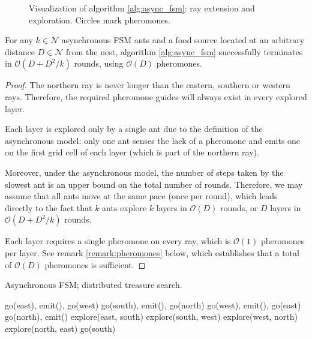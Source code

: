 \begin{figure}[!ht]
\begin{tikzpicture}[scale=0.70]
\end{tikzpicture}
\caption{Visualization of algorithm \ref{alg:async_fsm}: ray extension and exploration. Circles mark pheromones.}
\label{fig:async_fsm}
\end{figure}

\begin{theorem}
For any $k \in \mathcal{N}$ asynchronous FSM ants and a food
 source located at an arbitrary distance $D \in \mathcal{N}$ from the nest, 
algorithm \ref{alg:async_fsm} successfully terminates in $\mathcal{O}(D + D^2/k)$
rounds, using $\mathcal{O}(D)$ pheromones.
\end{theorem}

\begin{proof}
The northern ray is never longer than the eastern, southern or western rays. Therefore,
the required pheromone guides will always exist in every explored layer.

Each layer is explored only by a single ant due to the definition of the asynchronous
 model: only one ant senses the lack of a pheromone and emits one
 on the first grid cell of each layer (which is part of the northern ray). 

Moreover, under the asynchronous model, the number of steps taken by the slowest ant
 is an upper bound on the total number of
 rounds. Therefore, we may assume that all ants move at the same pace (once per round),
which leads directly to the fact that $k$ ants explore $k$ layers in $\mathcal{O}(D)$ rounds,
or $D$ layers in $\mathcal{O}(D + D^2 / k)$ rounds.

Each layer requires a single pheromone on every ray, which is $\mathcal{O}(1)$
pheromones per layer. See remark \ref{remark:pheromones} below, which establishes that
a total of $\mathcal{O}(D)$ pheromones is sufficient.
\end{proof}

\begin{algorithm}
  \caption{Asynchronous FSM; distributed treasure search.}
  \label{alg:async_fsm}
  \begin{algorithmic}[1]
        \State go(east), emit(), go(west) 
        \State go(south), emit(), go(north) 
        \State go(west), emit(), go(east)
        \State go(north), emit() 
        \State explore(east, south) 
        \State explore(south, west)
        \State explore(west, north)
        \State explore(north, east) 
        \State go(south)
      \EndWhile
  \end{algorithmic}
\end{algorithm}

